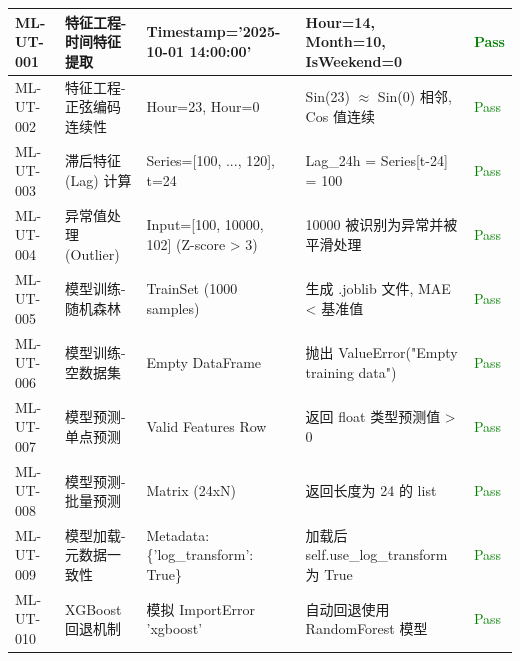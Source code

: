 \begin{longtable}{|p{2.5cm}|p{4cm}|p{4cm}|p{3.5cm}|p{1.5cm}|}
    ML-UT-001      & 特征工程-时间特征提取     & Timestamp='2025-10-01 14:00:00'       & Hour=14, Month=10, IsWeekend=0       & \textcolor{green}{Pass} \\ \hline
    ML-UT-002      & 特征工程-正弦编码连续性    & Hour=23, Hour=0                       & Sin(23) $\approx$ Sin(0) 相邻, Cos 值连续 & \textcolor{green}{Pass} \\ \hline
    ML-UT-003      & 滞后特征 (Lag) 计算   & Series=[100, ..., 120], t=24          & Lag\_24h = Series[t-24] = 100        & \textcolor{green}{Pass} \\ \hline
    ML-UT-004      & 异常值处理 (Outlier) & Input=[100, 10000, 102] (Z-score > 3) & 10000 被识别为异常并被平滑处理                   & \textcolor{green}{Pass} \\ \hline
    ML-UT-005      & 模型训练-随机森林       & TrainSet (1000 samples)               & 生成 .joblib 文件, MAE < 基准值             & \textcolor{green}{Pass} \\ \hline
    ML-UT-006      & 模型训练-空数据集       & Empty DataFrame                       & 抛出 ValueError("Empty training data") & \textcolor{green}{Pass} \\ \hline
    ML-UT-007      & 模型预测-单点预测       & Valid Features Row                    & 返回 float 类型预测值 > 0                   & \textcolor{green}{Pass} \\ \hline
    ML-UT-008      & 模型预测-批量预测       & Matrix (24xN)                         & 返回长度为 24 的 list                      & \textcolor{green}{Pass} \\ \hline
    ML-UT-009      & 模型加载-元数据一致性     & Metadata: \{'log\_transform': True\}  & 加载后 self.use\_log\_transform 为 True  & \textcolor{green}{Pass} \\ \hline
    ML-UT-010      & XGBoost 回退机制    & 模拟 ImportError 'xgboost'              & 自动回退使用 RandomForest 模型               & \textcolor{green}{Pass} \\ \hline
\end{longtable}

